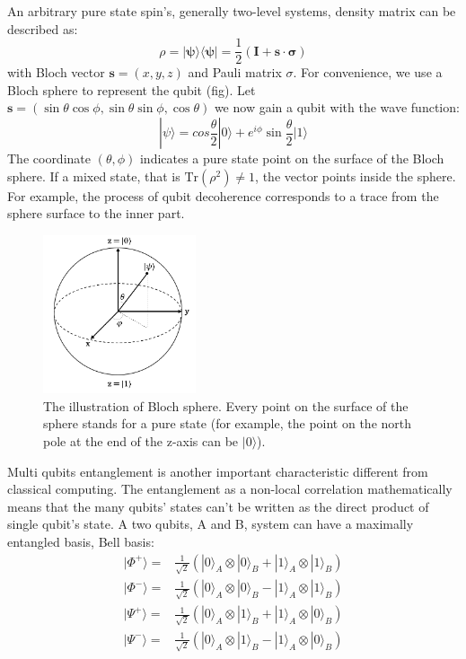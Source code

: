 An arbitrary pure state spin's, generally two-level systems, density matrix can be described as:
\begin{equation}\label{densitymatrix}
    \rho = |\mathbf{\psi}\rangle\langle\mathbf{\psi}| = \frac{1}{2} (\mathbf{I} + \mathbf{s\cdot\sigma})
\end{equation}
with Bloch vector $\mathbf{s} = (x, y, z)$ and Pauli matrix $\sigma$. For convenience, we use a Bloch sphere to represent the qubit (fig). Let $\mathbf{s} = ( \sin{\theta}\cos{\phi}, \sin{\theta}\sin{\phi}, \cos{\theta})$ we now gain a qubit with the wave function: 
\begin{equation}
    |\psi\rangle = cos\frac{\theta}{2}|0\rangle + e^{i\phi}\sin{\frac{\theta}{2}}|1\rangle
\end{equation}
The coordinate $(\theta, \phi)$ indicates a pure state point on the surface of the Bloch sphere. If a mixed state, that is $\text{Tr}(\rho^2) \neq 1$, the vector points inside the sphere. For example, the process of qubit decoherence corresponds to a trace from the sphere surface to the inner part.
\begin{figure}[h!]
    \centering
    \includegraphics[width=0.4\textwidth]{Pic/Blochsphere.png}
    \caption{The illustration of Bloch sphere. Every point on the surface of the sphere stands for a pure state (for example, the point on the north pole at the end of the z-axis can be $|0\rangle$).}
    \label{fig:my_label}
\end{figure}
Multi qubits entanglement is another important characteristic different from classical computing. The entanglement as a non-local correlation mathematically means that the many qubits' states can't be written as the direct product of single qubit's state. A two qubits, A and B, system can have a maximally entangled basis, Bell basis:
\begin{equation}
    \begin{array}{cc}
         |\Phi^+\rangle =& \frac{1}{\sqrt{2}}(|0\rangle_A\otimes|0\rangle_B + |1\rangle_A\otimes|1\rangle_B)  \\
         |\Phi^-\rangle =& \frac{1}{\sqrt{2}}(|0\rangle_A\otimes|0\rangle_B - |1\rangle_A\otimes|1\rangle_B)  \\
         |\Psi^+\rangle =& \frac{1}{\sqrt{2}}(|0\rangle_A\otimes|1\rangle_B + |1\rangle_A\otimes|0\rangle_B)  \\
         |\Psi^-\rangle =& \frac{1}{\sqrt{2}}(|0\rangle_A\otimes|1\rangle_B - |1\rangle_A\otimes|0\rangle_B) 
    \end{array}
\end{equation}
